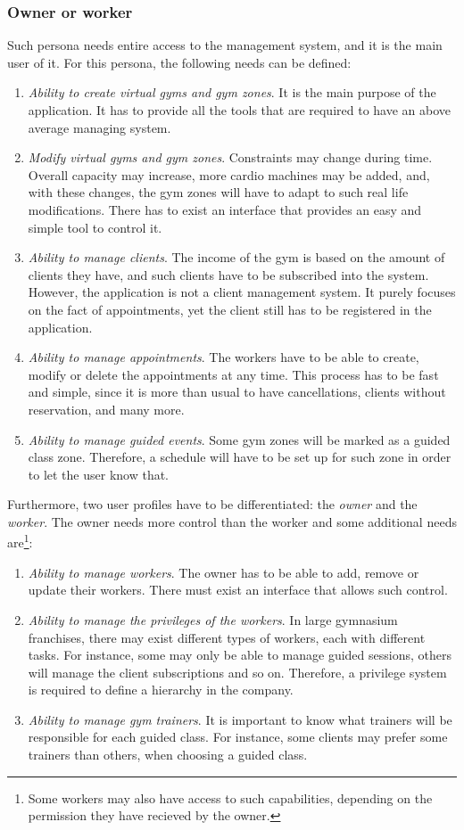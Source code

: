 \documentclass[a4paper, 12pt, oneside]{book}
\begin{document}
\subsubsection{Owner or worker}
Such persona needs entire access to the management system, and it is the main user of it. For this persona, the following needs can be defined:
\begin{enumerate}[label = -]
	\item \emph{Ability to create virtual gyms and gym zones}. It is the main purpose of the application. It has to provide all the tools that are required to have an above average managing system.
	\item \emph{Modify virtual gyms and gym zones}. Constraints may change during time. Overall capacity may increase, more cardio machines may be added, and, with these changes, the gym zones will have to adapt to such real life modifications. There has to exist an interface that provides an easy and simple tool to control it.
	\item \emph{Ability to manage clients}. The income of the gym is based on the amount of clients they have, and such clients have to be subscribed into the system. However, the application is not a client management system. It purely focuses on the fact of appointments, yet the client still has to be registered in the application.
	\item \emph{Ability to manage appointments}. The workers have to be able to create, modify or delete the appointments at any time. This process has to be fast and simple, since it is more than usual to have cancellations, clients without reservation, and many more.
	\item \emph{Ability to manage guided events}. Some gym zones will be marked as a guided class zone. Therefore, a schedule will have to be set up for such zone in order to let the user know that.
\end{enumerate}
Furthermore, two user profiles have to be differentiated: the \emph{owner} and the \emph{worker}. The owner needs more control than the worker and some additional needs are\footnote{Some workers may also have access to such capabilities, depending on the permission they have recieved by the owner.}:
\begin{enumerate}[label = -]
	\item \emph{Ability to manage workers}. The owner has to be able to add, remove or update their workers. There must exist an interface that allows such control.
	\item \emph{Ability to manage the privileges of the workers}. In large gymnasium franchises, there may exist different types of workers, each with different tasks. For instance, some may only be able to manage guided sessions, others will manage the client subscriptions and so on. Therefore, a privilege system is required to define a hierarchy in the company.
	\item \emph{Ability to manage gym trainers}. It is important to know what trainers will be responsible for each guided class. For instance, some clients may prefer some trainers than others, when choosing a guided class.
\end{enumerate}
\end{document}
